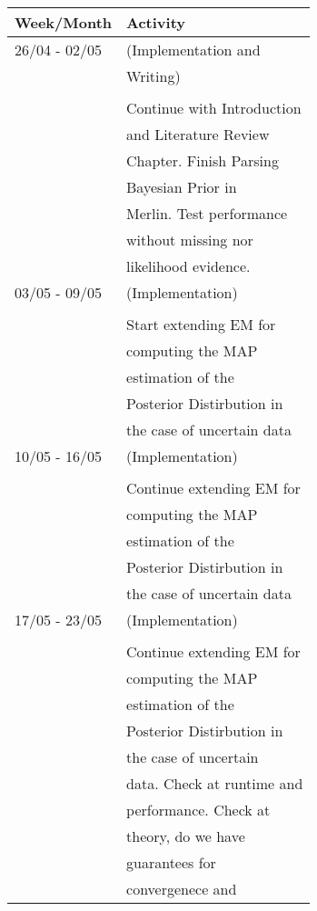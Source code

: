 \documentclass[a4paper]{article}
\begin{document}
\newpage

\begin{center}
\begin{tabular}{|l|l|}
\hline
Week/Month & Activity \\
\hline
26/04 - 02/05 & (Implementation and \\
 & Writing) \\
 & \\
 & Continue with Introduction \\
 & and Literature Review \\
 & Chapter. Finish Parsing \\
 & Bayesian Prior in \\
 & Merlin. Test performance \\
 & without missing nor \\
 & likelihood evidence. \\
\hline
03/05 - 09/05 & (Implementation) \\
 & \\
 & Start extending EM for \\
 & computing the MAP \\
 & estimation of the \\
 & Posterior Distirbution in \\
 & the case of uncertain data \\
\hline
10/05 - 16/05 & (Implementation) \\
 & \\
 & Continue extending EM for \\
 & computing the MAP \\
 & estimation of the \\
 & Posterior Distirbution in \\
 & the case of uncertain data \\
\hline
17/05 - 23/05 & (Implementation) \\
 & \\
 & Continue extending EM for \\
 & computing the MAP \\
 & estimation of the \\
 & Posterior Distirbution in \\
 & the case of uncertain \\
 & data. Check at runtime and \\
 & performance. Check at \\
 & theory, do we have \\
 & guarantees for \\
 & convergenece and \\

\end{tabular}
\end{center}
\end{document}
